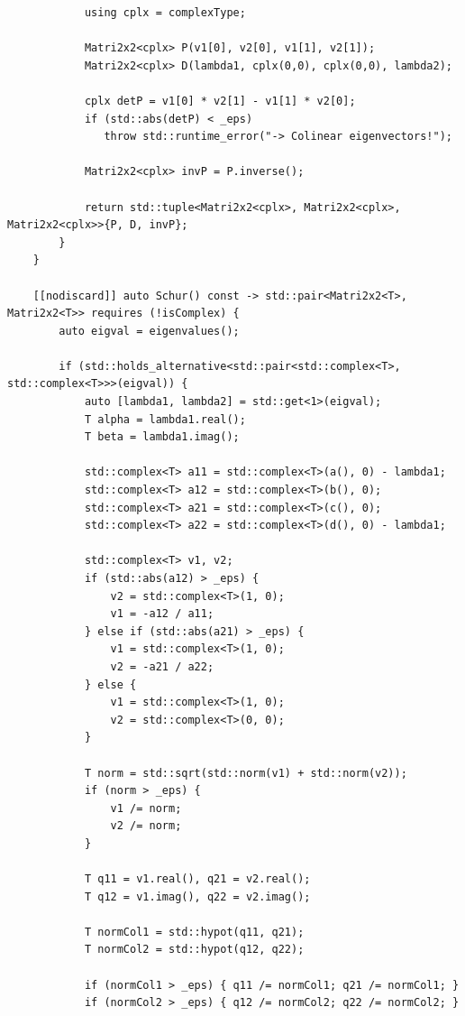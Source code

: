 \documentclass[11pt]{article}
\begin{document}
\begin{lstlisting}
            using cplx = complexType;
            
            Matri2x2<cplx> P(v1[0], v2[0], v1[1], v2[1]);
            Matri2x2<cplx> D(lambda1, cplx(0,0), cplx(0,0), lambda2);
            
            cplx detP = v1[0] * v2[1] - v1[1] * v2[0];
            if (std::abs(detP) < _eps)
               throw std::runtime_error("-> Colinear eigenvectors!");
            
            Matri2x2<cplx> invP = P.inverse();
            
            return std::tuple<Matri2x2<cplx>, Matri2x2<cplx>, Matri2x2<cplx>>{P, D, invP};
        }
    }

    [[nodiscard]] auto Schur() const -> std::pair<Matri2x2<T>, Matri2x2<T>> requires (!isComplex) {
        auto eigval = eigenvalues();
        
        if (std::holds_alternative<std::pair<std::complex<T>, std::complex<T>>>(eigval)) {
            auto [lambda1, lambda2] = std::get<1>(eigval);
            T alpha = lambda1.real();
            T beta = lambda1.imag();
            
            std::complex<T> a11 = std::complex<T>(a(), 0) - lambda1;
            std::complex<T> a12 = std::complex<T>(b(), 0);
            std::complex<T> a21 = std::complex<T>(c(), 0);
            std::complex<T> a22 = std::complex<T>(d(), 0) - lambda1;
            
            std::complex<T> v1, v2;
            if (std::abs(a12) > _eps) {
                v2 = std::complex<T>(1, 0);
                v1 = -a12 / a11;
            } else if (std::abs(a21) > _eps) {
                v1 = std::complex<T>(1, 0);
                v2 = -a21 / a22;
            } else {
                v1 = std::complex<T>(1, 0);
                v2 = std::complex<T>(0, 0);
            }
            
            T norm = std::sqrt(std::norm(v1) + std::norm(v2));
            if (norm > _eps) {
                v1 /= norm;
                v2 /= norm;
            }
            
            T q11 = v1.real(), q21 = v2.real();
            T q12 = v1.imag(), q22 = v2.imag();
            
            T normCol1 = std::hypot(q11, q21);
            T normCol2 = std::hypot(q12, q22);
            
            if (normCol1 > _eps) { q11 /= normCol1; q21 /= normCol1; }
            if (normCol2 > _eps) { q12 /= normCol2; q22 /= normCol2; }
            

\end{lstlisting}
\end{document}
